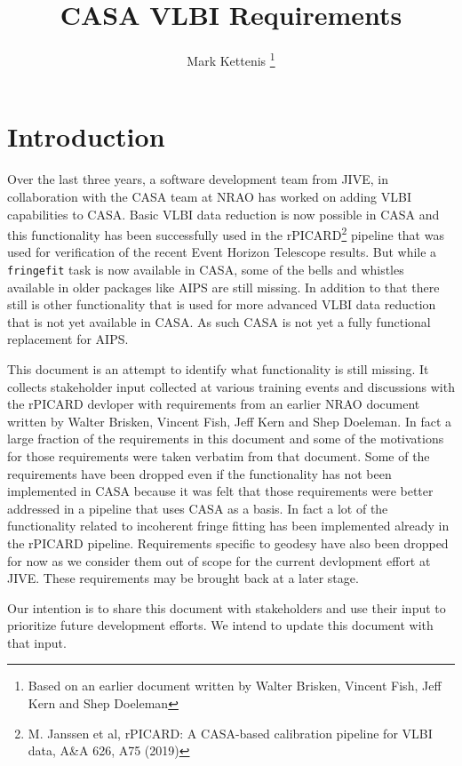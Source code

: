 \documentclass[11pt,a4paper]{article}
\begin{document}
\title{CASA VLBI Requirements} \author{Mark Kettenis
  \footnote{Based on an earlier document written by Walter Brisken,
    Vincent Fish, Jeff Kern and Shep Doeleman}}
\maketitle

\section{Introduction}

Over the last three years, a software development team from JIVE, in
collaboration with the CASA team at NRAO has worked on adding VLBI
capabilities to CASA.  Basic VLBI data reduction is now possible in
CASA and this functionality has been successfully used in the
rPICARD\footnote{M. Janssen et al, rPICARD: A CASA-based calibration
  pipeline for VLBI data, A\&A 626, A75 (2019)} pipeline that was used
for verification of the recent Event Horizon Telescope results.  But
while a \texttt{fringefit} task is now available in CASA, some of the
bells and whistles available in older packages like AIPS are still
missing.  In addition to that there still is other functionality that
is used for more advanced VLBI data reduction that is not yet
available in CASA.  As such CASA is not yet a fully functional
replacement for AIPS.

This document is an attempt to identify what functionality is still
missing.  It collects stakeholder input collected at various training
events and discussions with the rPICARD devloper with requirements
from an earlier NRAO document written by Walter Brisken, Vincent Fish,
Jeff Kern and Shep Doeleman.  In fact a large fraction of the
requirements in this document and some of the motivations for those
requirements were taken verbatim from that document.  Some of the
requirements have been dropped even if the functionality has not been
implemented in CASA because it was felt that those requirements were
better addressed in a pipeline that uses CASA as a basis.  In fact a
lot of the functionality related to incoherent fringe fitting has been
implemented already in the rPICARD pipeline.  Requirements specific to
geodesy have also been dropped for now as we consider them out of
scope for the current devlopment effort at JIVE.  These requirements
may be brought back at a later stage.

Our intention is to share this document with stakeholders and use
their input to prioritize future development efforts.  We intend to
update this document with that input.
\end{document}
